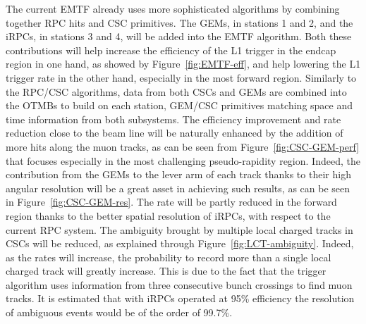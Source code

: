 	The current EMTF already uses more sophisticated algorithms by combining together RPC hits and CSC primitives. The GEMs, in stations 1 and 2, and the iRPCs, in stations 3 and 4, will be added into the EMTF algorithm. Both these contributions will help increase the efficiency of the L1 trigger in the endcap region in one hand, as showed by Figure~\ref{fig:EMTF-eff}, and help lowering the L1 trigger rate in the other hand, especially in the most forward region. Similarly to the RPC/CSC algorithms, data from both CSCs and GEMs are combined into the \acf{OTMBs} to build on each station, GEM/CSC primitives matching space and time information from both subsystems. The efficiency improvement and rate reduction close to the beam line will be naturally enhanced by the addition of more hits along the muon tracks, as can be seen from Figure~\ref{fig:CSC-GEM-perf} that focuses especially in the most challenging pseudo-rapidity region. Indeed, the contribution from the GEMs to the lever arm of each track thanks to their high angular resolution will be a great asset in achieving such results, as can be seen in Figure~\ref{fig:CSC-GEM-res}. The rate will be partly reduced in the forward region thanks to the better spatial resolution of iRPCs, with respect to the current RPC system. The ambiguity brought by multiple local charged tracks in CSCs will be reduced, as explained through Figure~\ref{fig:LCT-ambiguity}. Indeed, as the rates will increase, the probability to record more than a single local charged track will greatly increase. This is due to the fact that the trigger algorithm uses information from three consecutive bunch crossings to find muon tracks. It is estimated that with iRPCs operated at 95\% efficiency the resolution of ambiguous events would be of the order of 99.7\%.
	
